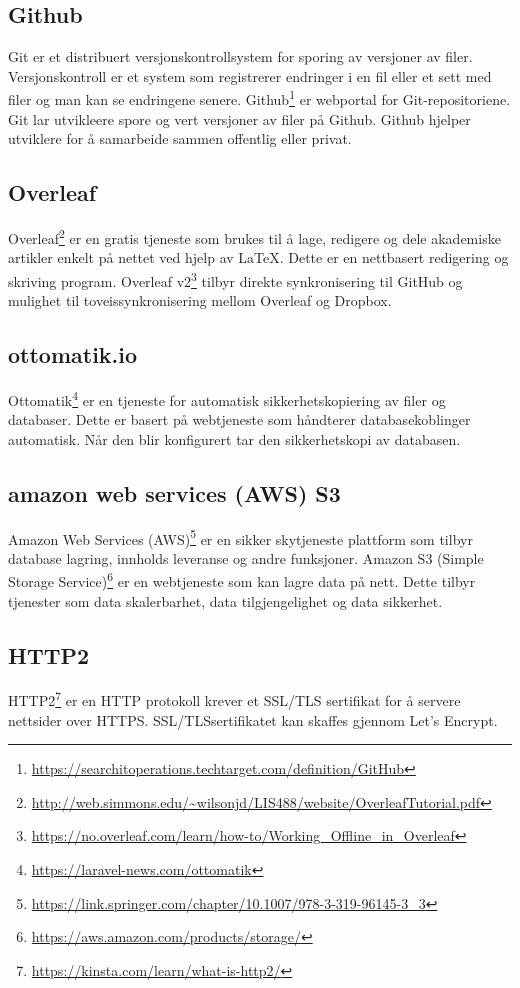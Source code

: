 \subsection{Github}
 Git er et distribuert versjonskontrollsystem for sporing av versjoner av filer. Versjonskontroll er et system som registrerer endringer i en fil eller et sett med filer og man kan se endringene senere. Github\footnote{ \url{https://searchitoperations.techtarget.com/definition/GitHub}} er webportal for Git-repositoriene. Git lar utvikleere spore og vert versjoner av filer på Github. Github hjelper utviklere for å samarbeide sammen offentlig eller privat.
 
\subsection{Overleaf}
Overleaf\footnote{\url{http://web.simmons.edu/~wilsonjd/LIS488/website/OverleafTutorial.pdf}} er en gratis tjeneste som brukes til å lage, redigere og dele akademiske artikler enkelt på nettet ved hjelp av LaTeX. Dette er en nettbasert redigering og skriving program. 
Overleaf v2\footnote{\url{https://no.overleaf.com/learn/how-to/Working_Offline_in_Overleaf}} tilbyr direkte synkronisering til GitHub og mulighet til toveissynkronisering mellom Overleaf og Dropbox.

\subsection{ottomatik.io}
Ottomatik\footnote{\url{https://laravel-news.com/ottomatik}} er en tjeneste for automatisk sikkerhetskopiering av filer og databaser.
Dette er basert på webtjeneste som håndterer databasekoblinger automatisk. Når den blir konfigurert tar den sikkerhetskopi av databasen. 

\subsection{amazon web services (AWS) S3}
Amazon Web Services (AWS)\footnote{\url{https://link.springer.com/chapter/10.1007/978-3-319-96145-3_3}} er en sikker skytjeneste plattform som tilbyr database lagring, innholds leveranse og andre funksjoner. Amazon S3 (Simple Storage Service)\footnote{\url{https://aws.amazon.com/products/storage/}} er en webtjeneste som kan lagre data på nett. Dette tilbyr tjenester som data skalerbarhet, data tilgjengelighet og data sikkerhet.

\subsection{HTTP2}
HTTP2\footnote{\url{https://kinsta.com/learn/what-is-http2/}} er en HTTP protokoll krever et SSL/TLS sertifikat for å servere nettsider over HTTPS. SSL/TLSsertifikatet kan skaffes gjennom Let’s Encrypt.  

